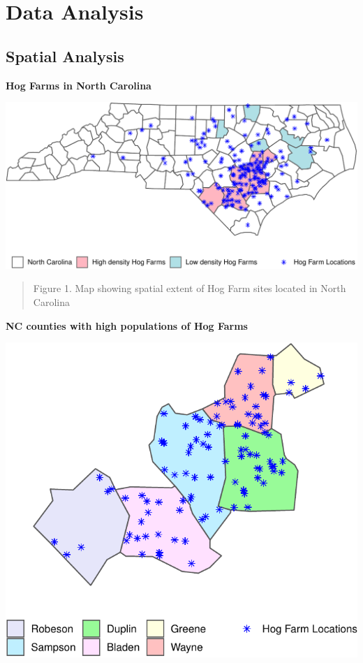 \documentclass[
  12pt,
]{article}
\begin{document}
\newpage

\newpage

\hypertarget{data-analysis}{%
\section{Data Analysis}\label{data-analysis}}

\hypertarget{spatial-analysis}{%
\subsection{Spatial Analysis}\label{spatial-analysis}}

\textbf{Hog Farms in North Carolina}

\begin{flushleft}\includegraphics{JacobChan_FinalProject_HogFarms_files/figure-latex/spatial-1} \end{flushleft}

\begin{quote}
Figure 1. Map showing spatial extent of Hog Farm sites located in North
Carolina
\end{quote}

\newpage

\textbf{NC counties with high populations of Hog Farms}

\begin{center}\includegraphics{JacobChan_FinalProject_HogFarms_files/figure-latex/unnamed-chunk-3-1} \end{center}
\end{document}

